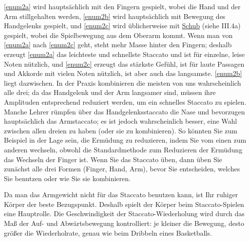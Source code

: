 \ref{enum2a} wird hauptsächlich mit den Fingern gespielt, wobei die Hand und der Arm stillgehalten werden, \ref{enum2b} wird hauptsächlich mit Bewegung des Handgelenks gespielt, und \ref{enum2c} wird üblicherweise mit \hyperref[c1iii4SchubZug]{Schub} (siehe III.4a) gespielt, wobei die Spielbewegung aus dem Oberarm kommt.
Wenn man von \ref{enum2a} nach \ref{enum2c} geht, steht mehr Masse hinter den Fingern; deshalb erzeugt \ref{enum2a} das leichteste und schnellste Staccato und ist für einzelne, leise Noten nützlich, und \ref{enum2c} erzeugt das stärkste Gefühl, ist für laute Passagen und Akkorde mit vielen Noten nützlich, ist aber auch das langsamste.
\ref{enum2b} liegt dazwischen.
In der Praxis kombinieren die meisten von uns wahrscheinlich alle drei; da das Handgelenk und der Arm langsamer sind, müssen ihre Amplituden entsprechend reduziert werden, um ein schnelles Staccato zu spielen.
Manche Lehrer rümpfen über das Handgelenksstaccato die Nase und bevorzugen hauptsächlich das Armstaccato; es ist jedoch wahrscheinlich besser, eine Wahl zwischen allen dreien zu haben (oder sie zu kombinieren).
So könnten Sie zum Beispiel in der Lage sein, die Ermüdung zu reduzieren, indem Sie vom einen zum anderen wechseln, obwohl die Standardmethode zum Reduzieren der Ermüdung das Wechseln der Finger ist.
Wenn Sie das Staccato üben, dann üben Sie zunächst alle drei Formen (Finger, Hand, Arm), bevor Sie entscheiden, welches Sie benutzen oder wie Sie sie kombinieren.

Da man das Armgewicht nicht für das Staccato benutzen kann, ist Ihr ruhiger Körper der beste Bezugspunkt.
Deshalb spielt der Körper beim Staccato-Spielen eine Hauptrolle.
Die Geschwindigkeit der Staccato-Wiederholung wird durch das Maß der Auf- und Abwärtsbewegung kontrolliert: je kleiner die Bewegung, desto größer die Wiederholrate, genau wie beim Dribbeln eines Basketballs.
  


